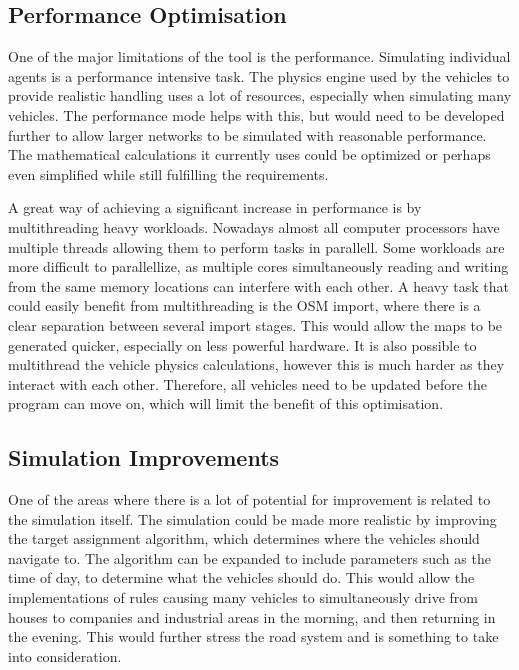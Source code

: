     \subsection{Performance Optimisation}
        One of the major limitations of the tool is the performance. Simulating individual agents is a performance intensive task. The physics engine used by the vehicles to provide realistic handling uses a lot of resources, especially when simulating many vehicles. The performance mode helps with this, but would need to be developed further to allow larger networks to be simulated with reasonable performance. The mathematical calculations it currently uses could be optimized or perhaps even simplified while still fulfilling the requirements.

        A great way of achieving a significant increase in performance is by multithreading heavy workloads. Nowadays almost all computer processors have multiple threads allowing them to perform tasks in parallell. Some workloads are more difficult to parallellize, as multiple cores simultaneously reading and writing from the same memory locations can interfere with each other. A heavy task that could easily benefit from multithreading is the OSM import, where there is a clear separation between several import stages. This would allow the maps to be generated quicker, especially on less powerful hardware. It is also possible to multithread the vehicle physics calculations, however this is much harder as they interact with each other. Therefore, all vehicles need to be updated before the program can move on, which will limit the benefit of this optimisation.


    \subsection{Simulation Improvements}
        One of the areas where there is a lot of potential for improvement is related to the simulation itself. The simulation could be made more realistic by improving the target assignment algorithm, which determines where the vehicles should navigate to. The algorithm can be expanded to include parameters such as the time of day, to determine what the vehicles should do. This would allow the implementations of rules causing many vehicles to simultaneously drive from houses to companies and industrial areas in the morning, and then returning in the evening. This would further stress the road system and is something to take into consideration.
        
